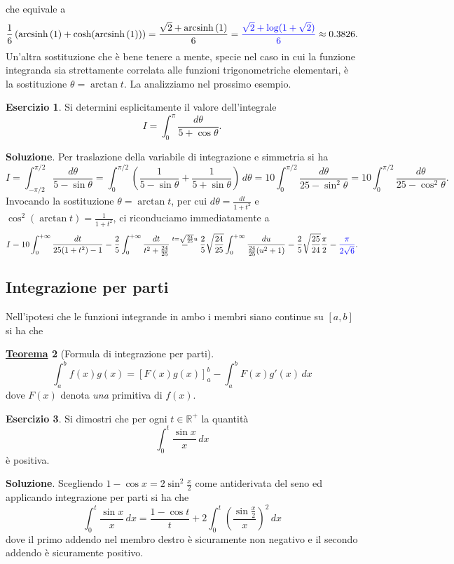 \documentclass[a4paper,twoside]{article}
\newcommand{\R}{\mathbb{R}}
\newcommand{\arcsinh}[1]{\operatorname{arcsinh}\left(#1\right)}
\theoremstyle{definition}
\newtheorem{theorem}{\color{Red}\underline{\textrm Teorema}}
\newenvironment{theo}
  {\begin{shaded}\begin{theorem}}
  {\end{theorem}\end{shaded}}
\newtheorem{ex}[theorem]{Esercizio}
\numberwithin{theorem}{section}
\begin{document}
che equivale a 
$$ \frac{1}{6}\left(\arcsinh{1}+\cosh(\arcsinh{1})\right) = \frac{\sqrt{2}+\arcsinh{1}}{6}={\color{blue}\frac{\sqrt{2}+\log(1+\sqrt{2})}{6}}\approx 0.3826. $$
Un'altra sostituzione che è bene tenere a mente, specie nel caso in cui la funzione integranda sia strettamente correlata alle funzioni trigonometriche elementari, è la sostituzione $\theta=\arctan t$. La analizziamo nel prossimo esempio.
\begin{ex} Si determini esplicitamente il valore dell'integrale 
$$ I = \int_{0}^{\pi}\frac{d\theta}{5+\cos\theta}.$$
\end{ex}
\textbf{Soluzione}. Per traslazione della variabile di integrazione e simmetria si ha 
$$ I = \int_{-\pi/2}^{\pi/2}\frac{d\theta}{5-\sin\theta} = \int_{0}^{\pi/2}\left(\frac{1}{5-\sin\theta}+\frac{1}{5+\sin\theta}\right)\,d\theta = 10\int_{0}^{\pi/2}\frac{d\theta}{25-\sin^2\theta}=10\int_{0}^{\pi/2}\frac{d\theta}{25-\cos^2\theta}. $$
Invocando la sostituzione $\theta=\arctan t$, per cui $d\theta=\frac{dt}{1+t^2}$ e $\cos^2(\arctan t)=\frac{1}{1+t^2}$, ci riconduciamo immediatamente a
$$ I = 10\int_{0}^{+\infty}\frac{dt}{25(1+t^2)-1}=\frac{2}{5}\int_{0}^{+\infty}\frac{dt}{t^2+\frac{24}{25}}\stackrel{t=\sqrt{\frac{24}{25}}u}{=}\frac{2}{5}\sqrt{\frac{24}{25}}\int_{0}^{+\infty}\frac{du}{\frac{24}{25}(u^2+1)}=\frac{2}{5}\sqrt{\frac{25}{24}}\frac{\pi}{2} = {\color{blue}\frac{\pi}{2\sqrt{6}}}. $$

\newpage

\subsection{Integrazione per parti}
Nell'ipotesi che le funzioni integrande in ambo i membri siano continue su $[a,b]$ si ha che 
\begin{theo}[Formula di integrazione per parti]
$$ \int_{a}^{b} f(x)g(x) = \left[ F(x)g(x)\right]_{a}^{b}-\int_{a}^{b} F(x)g'(x)\,dx $$
dove $F(x)$ denota \emph{una} primitiva di $f(x)$.\end{theo}
\begin{ex} Si dimostri che per ogni $t\in\R^+$ la quantità 
$$ \int_{0}^{t}\frac{\sin x}{x}\,dx $$
è positiva. 
\end{ex}
\textbf{Soluzione}. Scegliendo $1-\cos x = 2\sin^2\frac{x}{2}$ come antiderivata del seno ed applicando integrazione per parti si ha che 
$$ \int_{0}^{t}\frac{\sin x}{x}\,dx = \frac{1-\cos t}{t}+2\int_{0}^{t}\left(\frac{\sin\frac{x}{2}}{x}\right)^2\,dx $$
dove il primo addendo nel membro destro è sicuramente non negativo e il secondo addendo è sicuramente positivo.
\end{document}
